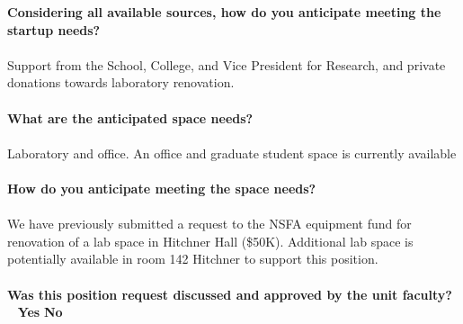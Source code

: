 \documentclass[11pt]{article}
\begin{document}
\vfill
\noindent\textbf{\rmfamily Considering all available sources, how do you anticipate meeting the startup needs?}\\~\\
Support from the School, College, and Vice President for Research, and private donations towards laboratory renovation.\\~\\
\vfill
\noindent\textbf{\rmfamily What are the anticipated space needs?}\\~\\ Laboratory and office. An office and graduate student space is currently available\\~\\
\vfill
\noindent\textbf{\rmfamily How do you anticipate meeting the space needs?} \\~\\
We have previously submitted a request to the NSFA equipment fund for renovation of a lab space in Hitchner Hall (\$50K). Additional lab space is potentially available in room 142 Hitchner to support this position.\\~\\
\vfill
\noindent\textbf{\rmfamily Was this position request discussed and approved by the unit faculty?} \hfill ~ \hfill \textbf{\Large{\HollowBox} \normalsize{Yes}} \hfill \textbf{\Large{\HollowBox} \normalsize{ No}}\\~\\%
\end{document}
